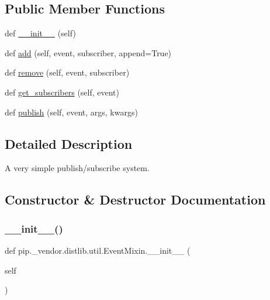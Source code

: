\subsection*{Public Member Functions}
\begin{DoxyCompactItemize}
\item 
def \hyperlink{classpip_1_1__vendor_1_1distlib_1_1util_1_1EventMixin_a4ed3ac19bcba8dcb1136495a7eb8315e}{\+\_\+\+\_\+init\+\_\+\+\_\+} (self)
\item 
def \hyperlink{classpip_1_1__vendor_1_1distlib_1_1util_1_1EventMixin_a59395574411aaf4383687b2d5b0b9acd}{add} (self, event, subscriber, append=True)
\item 
def \hyperlink{classpip_1_1__vendor_1_1distlib_1_1util_1_1EventMixin_aa6ba25c788248661ab22b49e45bfb573}{remove} (self, event, subscriber)
\item 
def \hyperlink{classpip_1_1__vendor_1_1distlib_1_1util_1_1EventMixin_af8db5a61bb5ef5276efd44d7c5d7a3e3}{get\+\_\+subscribers} (self, event)
\item 
def \hyperlink{classpip_1_1__vendor_1_1distlib_1_1util_1_1EventMixin_a24812a01ae12463262e231e4d3b537c3}{publish} (self, event, args, kwargs)
\end{DoxyCompactItemize}


\subsection{Detailed Description}
\begin{DoxyVerb}A very simple publish/subscribe system.
\end{DoxyVerb}
 

\subsection{Constructor \& Destructor Documentation}
\mbox{\label{classpip_1_1__vendor_1_1distlib_1_1util_1_1EventMixin_a4ed3ac19bcba8dcb1136495a7eb8315e}} 
\subsubsection{\texorpdfstring{\+\_\+\+\_\+init\+\_\+\+\_\+()}{\_\_init\_\_()}}
{\footnotesize\ttfamily def pip.\+\_\+vendor.\+distlib.\+util.\+Event\+Mixin.\+\_\+\+\_\+init\+\_\+\+\_\+ (\begin{DoxyParamCaption}\item[{}]{self }\end{DoxyParamCaption})}



